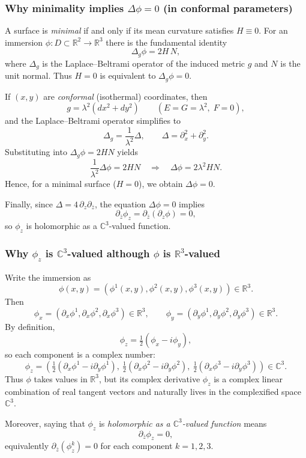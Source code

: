 \documentclass[12pt,a4paper]{article}
\theoremstyle{plain}
\theoremstyle{definition}      %
\begin{document}
\medskip

\subsubsection*{Why minimality implies $\Delta\phi=0$ (in conformal parameters)}
A surface is \emph{minimal} if and only if its mean curvature satisfies $H\equiv 0$.
For an immersion $\phi:D\subset\mathbb R^2\to\mathbb R^3$ there is the fundamental identity
\[
\Delta_g \phi = 2H\,N,
\]
where $\Delta_g$ is the Laplace--Beltrami operator of the induced metric $g$ and $N$ is the unit normal.
Thus $H=0$ is equivalent to $\Delta_g\phi=0$.

If $(x,y)$ are \emph{conformal} (isothermal) coordinates, then
\[
g=\lambda^2(dx^2+dy^2)\qquad (E=G=\lambda^2,\;F=0),
\]
and the Laplace--Beltrami operator simplifies to
\[
\Delta_g = \frac{1}{\lambda^2}\Delta,
\qquad
\Delta=\partial_x^2+\partial_y^2.
\]
Substituting into $\Delta_g\phi=2H N$ yields
\[
\frac{1}{\lambda^2}\Delta\phi = 2H N
\quad\Longrightarrow\quad
\Delta\phi = 2\lambda^2 H N.
\]
Hence, for a minimal surface ($H=0$), we obtain $\Delta\phi=0$.

Finally, since $\Delta = 4\,\partial_z\partial_{\bar z}$, the equation $\Delta\phi=0$ implies
\[
\partial_{\bar z}\phi_z=\partial_{\bar z}(\partial_z\phi)=0,
\]
so $\phi_z$ is holomorphic as a $\mathbb C^3$-valued function.

\medskip

\subsubsection*{Why $\phi_z$ is $\mathbb C^3$-valued although $\phi$ is $\mathbb R^3$-valued}
Write the immersion as
\[
\phi(x,y)=(\phi^1(x,y),\phi^2(x,y),\phi^3(x,y))\in\mathbb R^3.
\]
Then
\[
\phi_x=(\partial_x\phi^1,\partial_x\phi^2,\partial_x\phi^3)\in\mathbb R^3,
\qquad
\phi_y=(\partial_y\phi^1,\partial_y\phi^2,\partial_y\phi^3)\in\mathbb R^3.
\]
By definition,
\[
\phi_z=\tfrac12(\phi_x-i\phi_y),
\]
so each component is a complex number:
\[
\phi_z=
\left(
\tfrac12(\partial_x\phi^1-i\partial_y\phi^1),\
\tfrac12(\partial_x\phi^2-i\partial_y\phi^2),\
\tfrac12(\partial_x\phi^3-i\partial_y\phi^3)
\right)\in\mathbb C^3.
\]
Thus $\phi$ takes values in $\mathbb R^3$, but its complex derivative $\phi_z$ is a complex linear combination of real
tangent vectors and naturally lives in the complexified space $\mathbb C^3$.

Moreover, saying that $\phi_z$ is \emph{holomorphic as a $\mathbb C^3$-valued function} means
\[
\partial_{\bar z}\phi_z=0,
\]
equivalently $\partial_{\bar z}(\phi_z^k)=0$ for each component $k=1,2,3$.
\end{document}
